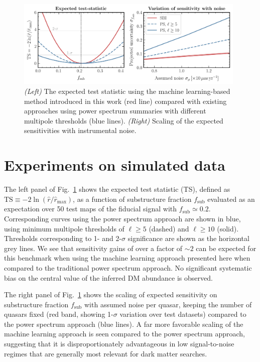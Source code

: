 \documentclass[]{article}
\begin{document}
\begin{figure}[!htbp]
\centering
\includegraphics[width=0.98\textwidth]{figures/results}
\caption{\emph{(Left)} The expected test statistic using the machine learning-based method introduced in this work (red line) compared with existing approaches using power spectrum summaries with different multipole thresholds (blue lines). \emph{(Right)} Scaling of the expected sensitivities with instrumental noise.}
\label{fig:experiment}
\end{figure}
 

\section{Experiments on simulated data}
\label{sec:experiments}

The left panel of Fig.~\ref{fig:experiment} shows the expected test statistic (TS), defined as $\mathrm{TS} \equiv -2\ln(\hat r / \hat r_\mathrm{max})$, as a function of substructure fraction $f_\mathrm{sub}$ evaluated as an expectation over 50 test maps of the fiducial signal with $f_\mathrm{sub} \simeq 0.2$. Corresponding curves using the power spectrum approach are shown in blue, using minimum multipole thresholds of $\ell \geq 5$ (dashed) and $\ell \geq 10$ (solid). Thresholds corresponding to 1- and 2-$\sigma$ significance are shown as the horizontal grey lines. We see that sensitivity gains of over a factor of $\sim 2$ can be expected for this benchmark when using the machine learning approach presented here when compared to the traditional power spectrum approach. No significant systematic bias on the central value of the inferred DM abundance is observed.

The right panel of Fig.~\ref{fig:experiment} shows the scaling of expected sensitivity on substructure fraction $f_\mathrm{sub}$ with assumed noise per quasar, keeping the number of quasars fixed (red band, showing 1-$\sigma$ variation over test datasets) compared to the power spectrum approach (blue lines). A far more favorable scaling of the machine learning approach is seen compared to the power spectrum approach, suggesting that it is disproportionately advantageous in low signal-to-noise regimes that are generally most relevant for dark matter searches.
\end{document}
